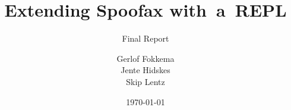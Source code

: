 \title[tudelft-black]{Extending Spoofax with~a~REPL}
\subtitle[tudelft-black]{Final Report}
\author[tudelft-black]{%
Gerlof Fokkema\\
Jente Hidskes\\
Skip Lentz}
\date{\today}


